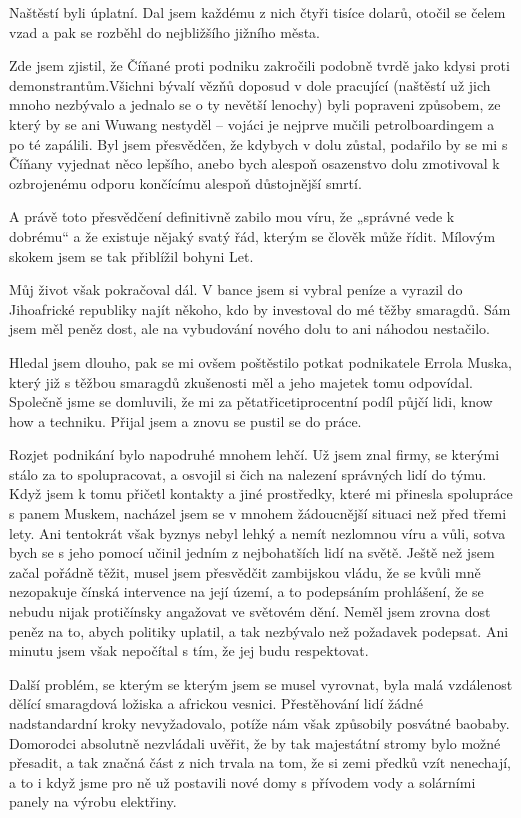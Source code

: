 Naštěstí byli úplatní. Dal jsem každému z nich čtyři tisíce dolarů, otočil se čelem vzad a pak se rozběhl do nejbližšího jižního města.

Zde jsem zjistil, že Číňané proti podniku zakročili podobně tvrdě jako kdysi proti demonstrantům.Všichni bývalí vězňů doposud v dole pracující (naštěstí už jich mnoho nezbývalo a jednalo se o ty nevětší lenochy) byli popraveni způsobem, ze který by se ani Wuwang nestyděl – vojáci je nejprve mučili petrolboardingem a po té zapálili. Byl jsem přesvědčen, že kdybych v dolu zůstal, podařilo by se mi s Číňany vyjednat něco lepšího, anebo bych alespoň osazenstvo dolu zmotivoval k ozbrojenému odporu končícímu alespoň důstojnější smrtí. 

 A právě toto přesvědčení definitivně zabilo mou víru, že „správné vede k dobrému“ a že existuje nějaký svatý řád, kterým se člověk může řídit. Mílovým skokem jsem se tak přiblížil bohyni Let.
 
Můj život však pokračoval dál. V bance jsem si vybral peníze a vyrazil do Jihoafrické republiky najít někoho, kdo by investoval do mé těžby smaragdů. Sám jsem měl peněz dost, ale na vybudování nového dolu to ani náhodou nestačilo.

Hledal jsem dlouho, pak se mi ovšem poštěstilo potkat podnikatele Errola Muska, který již s těžbou smaragdů zkušenosti měl a jeho majetek tomu odpovídal. Společně jsme se domluvili, že mi za pětatřicetiprocentní podíl půjčí lidi, know how a techniku. Přijal jsem a znovu se pustil se do práce.

Rozjet podnikání bylo napodruhé mnohem lehčí. Už jsem znal firmy, se kterými stálo za to spolupracovat, a osvojil si čich na nalezení správných lidí do týmu. Když jsem k tomu přičetl kontakty a jiné prostředky, které mi přinesla spolupráce s panem Muskem, nacházel jsem se v mnohem žádoucnější situaci než před třemi lety. Ani tentokrát však byznys nebyl lehký a nemít nezlomnou víru a vůli, sotva bych se s jeho pomocí učinil jedním z nejbohatších lidí na světě. Ještě než jsem začal pořádně těžit, musel jsem přesvědčit zambijskou vládu, že se kvůli mně nezopakuje čínská intervence na její území, a to podepsáním prohlášení, že se nebudu nijak protičínsky angažovat ve světovém dění. Neměl jsem zrovna dost peněz na to, abych politiky uplatil, a tak nezbývalo než požadavek podepsat. Ani minutu jsem však nepočítal s tím, že jej budu respektovat.

 Další problém, se kterým se kterým jsem se musel vyrovnat, byla malá vzdálenost dělící smaragdová ložiska a africkou vesnici. Přestěhování lidí žádné nadstandardní kroky nevyžadovalo, potíže nám však způsobily posvátné baobaby. Domorodci absolutně nezvládali uvěřit, že by tak majestátní stromy bylo možné přesadit, a tak značná část z nich trvala na tom, že si zemi předků vzít nenechají, a to i když jsme pro ně už postavili nové domy s přívodem vody a solárními panely na výrobu elektřiny.
 
